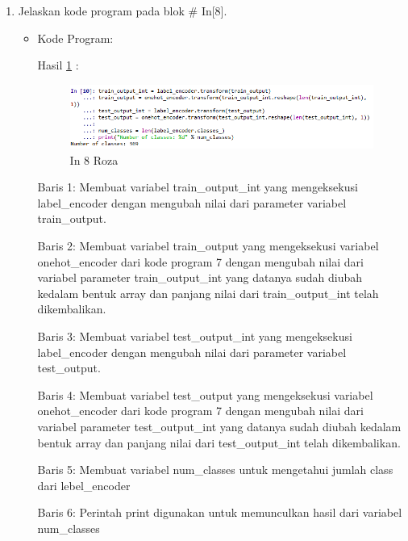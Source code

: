 \begin{enumerate}
\item Jelaskan kode program pada blok \# In[8].
\begin{itemize}
\item Kode Program:

\par Hasil \ref{in8roza} :
\begin{figure}[!hbtp]
\centering
\includegraphics[scale=0.7]{figures/prak8roza.png}
\caption{In 8 Roza}
\label{in8roza}
\end{figure}
\par Baris 1: Membuat variabel train\_output\_int yang mengeksekusi label\_encoder dengan mengubah nilai dari parameter variabel train\_output.
\par Baris 2: Membuat variabel train\_output yang mengeksekusi variabel onehot\_encoder dari kode program 7 dengan mengubah nilai dari variabel parameter train\_output\_int yang datanya sudah diubah kedalam bentuk array dan panjang nilai dari train\_output\_int telah dikembalikan.
\par Baris 3: Membuat variabel test\_output\_int yang mengeksekusi label\_encoder dengan mengubah nilai dari parameter variabel test\_output.
\par Baris 4: Membuat variabel test\_output yang mengeksekusi variabel onehot\_encoder dari kode program 7 dengan mengubah nilai dari variabel parameter test\_output\_int yang datanya sudah diubah kedalam bentuk array dan panjang nilai dari test\_output\_int telah dikembalikan.
\par Baris 5: Membuat variabel num\_classes untuk mengetahui jumlah class dari lebel\_encoder
\par Baris 6: Perintah print digunakan untuk memunculkan hasil dari variabel num\_classes
\end{itemize}
\par


\end{enumerate}
